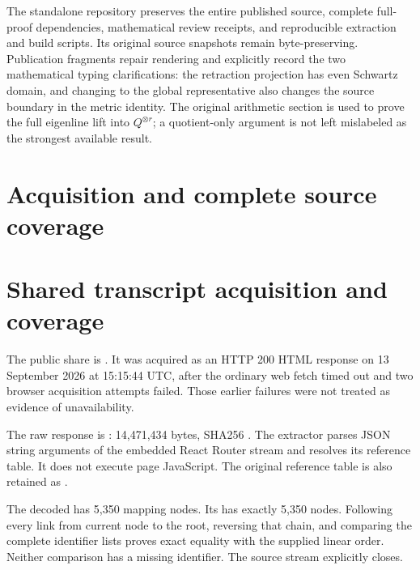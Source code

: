 The standalone repository preserves the entire published source,
complete full-proof dependencies, mathematical review receipts, and
reproducible extraction and build scripts. Its original source snapshots
remain byte-preserving. Publication fragments repair rendering and
explicitly record the two mathematical typing clarifications: the
retraction projection has even Schwartz domain, and changing to the
global representative also changes the source boundary in the metric
identity. The original arithmetic section is used to prove the full
eigenline lift into \(Q^{\otimes r}\); a quotient-only argument is not
left mislabeled as the strongest available result.

\clearpage

\section{Acquisition and complete source
coverage}\label{TranscriptLedgerStage:acquisition-and-complete-source-coverage}

\section{Shared transcript acquisition and
coverage}\label{TranscriptLedgerStage:shared-transcript-acquisition-and-coverage}

The public share is
\href{https://chatgpt.com/share/6aa6bc6e-98cc-83eb-9343-e811c26d6631}{\protect{}}.
It was acquired as an HTTP 200 HTML response on 13 September 2026 at
15:15:44 UTC, after the ordinary web fetch timed out and two browser
acquisition attempts failed. Those earlier failures were not treated as
evidence of unavailability.

The raw response is \protect{}: 14,471,434 bytes,
SHA256
\protect{}.
The extractor parses JSON string arguments of the embedded React Router
stream and resolves its reference table. It does not execute page
JavaScript. The original reference table is also retained as
\protect{}.

The decoded \protect{} has 5,350 mapping
nodes. Its \protect{} has exactly 5,350 nodes.
Following every \protect{} link from current node
\protect{} to the root,
reversing that chain, and comparing the complete identifier lists proves
exact equality with the supplied linear order. Neither comparison has a
missing identifier. The source stream explicitly closes.

